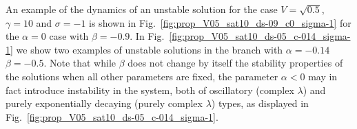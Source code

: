 \documentclass[aps,pre,showpacs,twocolumn]{revtex4}
\begin{document}
An example of the dynamics of an unstable solution for the case $V=\sqrt{0.5}$, $\gamma=10$ and $\sigma=-1$ is shown in Fig.~\ref{fig:prop_V05_sat10_ds-09_c0_sigma-1} for the $\alpha=0$ case with $\beta=-0.9$. In Fig.~\ref{fig:prop_V05_sat10_ds-05_c-014_sigma-1} we show two examples of unstable solutions  in the branch with $\alpha=-0.14$ $\beta=-0.5$. Note that while $\beta$ does not change by itself the stability properties of the solutions when all other parameters are fixed, the parameter $\alpha<0$ may in fact introduce instability in the system, both of oscillatory (complex $\lambda$) and purely exponentially decaying (purely complex $\lambda$) types, as displayed in Fig.~\ref{fig:prop_V05_sat10_ds-05_c-014_sigma-1}.

\end{document}
